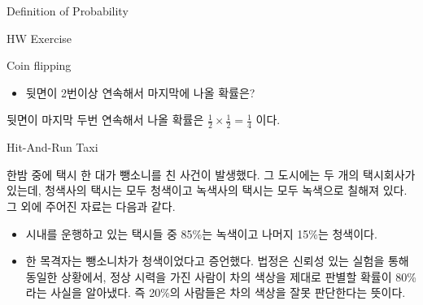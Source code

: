 \begin{edXchapter}{Definition of Probability}
\begin{edXsection}{HW Exercise}
\begin{edXvertical}
\begin{edXproblem}{Coin flipping}
\begin{itemize}
\begin{edXsolution}
먼저 k개의 문자열이 4개 이상의 연속된 H를 포함하지 않을 확률을 $P_k$라 정의해 두자.
이 문자열이 시작하는 방법은 다음 4가지가 있다.
\begin{enumerate}
\item T
\item HT
\item HHT
\item HHHT
\end{enumerate}
(주의: 이 네가지 방법들이 우리가 원하는 모든 경우를 나타내고 네 방법은 서로 겹치지 않음에 유의하자.)
(1)의 경우에 n개의 문자열이 4개 이상의 연속된 H를 포함하지 않으려면 T를 제외한 나머지 n-1 개의 문자열이
4개 이상의 연속된 H를 포함하지 않으면 된다. 첫번째에 T가 될 확률은 $\frac{1}{2}$이므로 (1)의 형태이고
n개의 문자열이 4개 이상 연속된 H를 포함하지 않을 확률은 $\frac{1}{2}P_{n-1}$이다. 

다른 경우들도 마찬가지로 생각하며 (2)의 경우 $\frac{1}{4}P_{n-2}$, (3)의 경우 $\frac{1}{8}P_{n-3}$,
(4)의 경우 $\frac{1}{16}P_{n-4}$이다. 따라서,
$P_n = \frac{1}{2}P_{n-1} + \frac{1}{4}P_{n-2} + \frac{1}{8}P_{n-3} + \frac{1}{16}P_{n-4}$ (n>=5)

$P_1 = P_2 = P_3 = 1$, $P4=\frac{15}{16}$이므로 $P5 = \frac{1}{2}\times\frac{15}{16} + \frac{1}{4}\times1 + \frac{1}{8}\times1 + \frac{1}{16}\times1 = \frac{29}{32}$
마찬가지로 $P_6$, $P_7$, ..., $P_10$을 구할 수 있다.
우리가 구하는 확률은 $1-P_{10} = \frac{251}{1024}$.
\end{edXsolution}
\item 뒷면이 2번이상 연속해서 마지막에 나올 확률은? 
\end{itemize}
\begin{edXsolution}
뒷면이 마지막 두번 연속해서 나올 확률은 $\frac{1}{2} \times \frac{1}{2} = \frac{1}{4}$ 이다.
\end{edXsolution}
\end{edXproblem}

\begin{edXproblem}{Hit-And-Run Taxi}

한밤 중에 택시 한 대가 뺑소니를 친 사건이 발생했다. 그 도시에는 두 개의 택시회사가 있는데,
청색사의 택시는 모두 청색이고 녹색사의 택시는 모두 녹색으로 칠해져 있다. 그 외에 주어진 
자료는 다음과 같다.
\begin{itemize}
\item 시내를 운행하고 있는 택시들 중 85\%는 녹색이고 나머지 15\%는 청색이다.
\item 한 목격자는 뺑소니차가 청색이었다고 증언했다. 법정은 신뢰성 있는 실험을 통해 동일한 상황에서,
정상 시력을 가진 사람이 차의 색상을 제대로 판별할 확률이 80\%라는 사실을 알아냈다. 즉 20\%의
사람들은 차의 색상을 잘못 판단한다는 뜻이다.
\end{itemize}


\end{edXproblem}
\end{edXvertical}
\end{edXsection}
\end{edXchapter}
